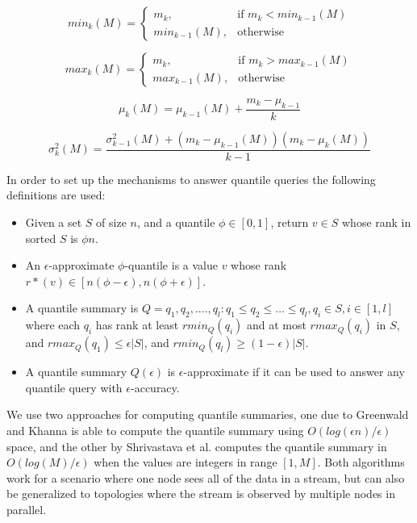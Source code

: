 \begin{equation}
    \label{eq:stream_min}
    min_k(M) =  \begin{cases}
        m_k,& \text{if } m_k < min_{k-1}(M)\\
        min_{k-1}(M),& \text{otherwise}
    \end{cases}
\end{equation}

\begin{equation}
    \label{eq:stream_max}
    max_k(M) =  \begin{cases}
        m_k,& \text{if } m_k > max_{k-1}(M)\\
        max_{k-1}(M),& \text{otherwise}
    \end{cases}
\end{equation}

\begin{equation}
    \label{eq:stream_mean}
    \mu_k(M) =  \mu_{k-1}(M) + \frac {m_k - \mu_{k-1}} {k} 
\end{equation}

\begin{equation}
    \label{eq:stream_variance}
    \sigma_k^2(M) =  \frac{\sigma_{k-1}^2(M) + (m_k - \mu_{k-1}(M))(m_k - \mu_k(M))}{k-1} 
\end{equation}

In order to set up the mechanisms to answer quantile queries the following definitions are used\autocite{garofalakis2016data}:

\begin{itemize}
    \item Given a set $S$ of size $n$, and a quantile $\phi \in [0,1]$, return $v \in S$ whose rank in sorted $S$ is $\phi n$. 
    \item An $\epsilon$-approximate $\phi$-quantile is a value $v$ whose rank $r*(v) \in [n(\phi-\epsilon), n(\phi+\epsilon)]$.
    \item A quantile summary is $Q = {q_1,q_2,....,q_l: q_1\le q_2 \le \dots \le q_l, q_i \in S, i \in [1,l]}$ where each $q_i$ has rank at least $rmin_Q(q_i)$ and at most $rmax_Q(q_i)$ in $S$, and $rmax_Q(q_1) \le \epsilon|S|$, and $rmin_Q(q_l) \ge (1-\epsilon)|S|$.
    \item A quantile summary $Q(\epsilon)$ is $\epsilon$-approximate if it can be used to answer any quantile query with $\epsilon$-accuracy.
\end{itemize}

We use two approaches for computing quantile summaries, one due to Greenwald and Khanna\autocite{greenwald2001space} is able to compute the quantile summary using $O(log(\epsilon n)/\epsilon)$ space, and the other by Shrivastava et al.\autocite{shrivastava2004medians} computes the quantile summary in $O(log(M)/\epsilon)$ when the values are integers in range $[1,M]$. Both algorithms work for a scenario where one node sees all of the data in a stream, but can also be generalized to topologies where the stream is observed by multiple nodes in parallel. 

